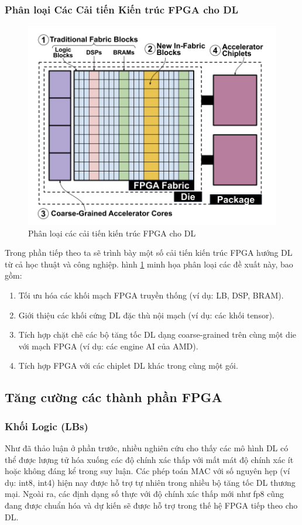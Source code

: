 \documentclass[a4paper]{article}
\begin{document}
\subsubsection{Phân loại Các Cải tiến Kiến trúc FPGA cho DL}

\begin{figure} [!h]
    \centering
    \includegraphics[width=0.75\linewidth]{assets/fpga_10.png}
    \caption{Phân loại các cải tiến kiến trúc FPGA cho DL}
    \label{fig:fpga_10}
\end{figure}
Trong phần tiếp theo ta sẽ trình bày một số cải tiến kiến trúc FPGA hướng DL từ cả học thuật và công nghiệp. hình \ref{fig:fpga_10} minh họa phân loại các đề xuất này, bao gồm:
\begin{enumerate}
    \item Tối ưu hóa các khối mạch FPGA truyền thống (ví dụ: LB, DSP, BRAM).
    \item Giới thiệu các khối cứng DL đặc thù nội mạch (ví dụ: các khối tensor).
    \item Tích hợp chặt chẽ các bộ tăng tốc DL dạng coarse-grained trên cùng một die với mạch FPGA (ví dụ: các engine AI của AMD).
    \item Tích hợp FPGA với các chiplet DL khác trong cùng một gói.
\end{enumerate}

\subsection{Tăng cường các thành phần FPGA}
\subsubsection{Khối Logic (LBs)}
Như đã thảo luận ở phần trước, nhiều nghiên cứu cho thấy các mô hình DL có thể được lượng tử hóa xuống các độ chính xác thấp với mất mát độ chính xác ít hoặc không đáng kể trong suy luận. Các phép toán MAC với số nguyên hẹp (ví dụ: int8, int4) hiện nay được hỗ trợ tự nhiên trong nhiều bộ tăng tốc DL thương mại. Ngoài ra, các định dạng số thực với độ chính xác thấp mới như fp8 cũng đang được chuẩn hóa và dự kiến sẽ được hỗ trợ trong thế hệ FPGA tiếp theo cho DL.
\end{document}
